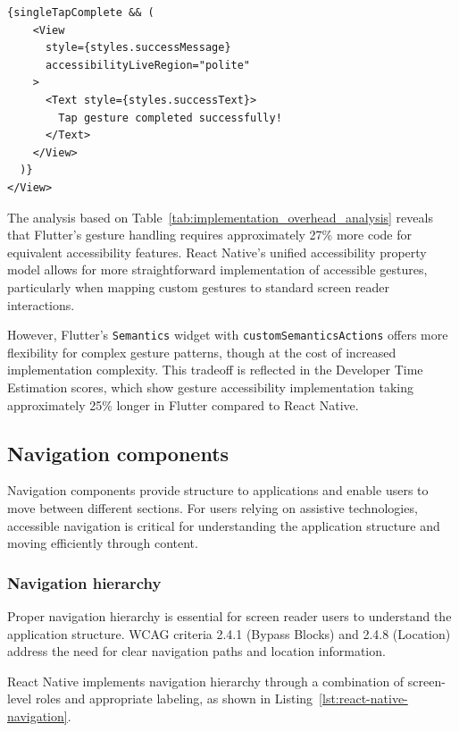 {\begin{lstlisting}[style=ReactNativeStyle, caption=Gesture handling in \textit{AccessibleHub}'s React Native implementation, label=lst:accessiblehub-gesture]
  {singleTapComplete && (
    <View 
      style={styles.successMessage} 
      accessibilityLiveRegion="polite"
    >
      <Text style={styles.successText}>
        Tap gesture completed successfully!
      </Text>
    </View>
  )}
</View>
\end{lstlisting}

The analysis based on Table~\ref{tab:implementation_overhead_analysis} reveals that Flutter's gesture handling requires approximately 27\% more code for equivalent accessibility features. React Native's unified accessibility property model allows for more straightforward implementation of accessible gestures, particularly when mapping custom gestures to standard screen reader interactions.

However, Flutter's \texttt{Semantics} widget with \texttt{customSemanticsActions} offers more flexibility for complex gesture patterns, though at the cost of increased implementation complexity. This tradeoff is reflected in the Developer Time Estimation scores, which show gesture accessibility implementation taking approximately 25\% longer in Flutter compared to React Native.

\subsection{Navigation components}
\label{subsec:navigation-components}

Navigation components provide structure to applications and enable users to move between different sections. For users relying on assistive technologies, accessible navigation is critical for understanding the application structure and moving efficiently through content.

\subsubsection{Navigation hierarchy}
\label{subsubsec:navigation-hierarchy}

Proper navigation hierarchy is essential for screen reader users to understand the application structure. WCAG criteria 2.4.1 (Bypass Blocks) and 2.4.8 (Location) address the need for clear navigation paths and location information.

React Native implements navigation hierarchy through a combination of screen-level roles and appropriate labeling, as shown in Listing~\ref{lst:react-native-navigation}.

}
